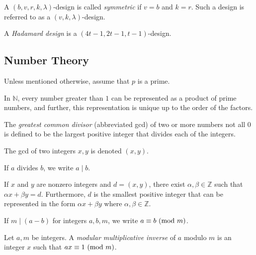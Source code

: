 \begin{definition}
    A $(b,v,r,k,\lambda)$-design is called \textit{symmetric} if $v=b$ and $k=r$. Such a design is referred to as a $(v,k,\lambda)$-design.
\end{definition}


\begin{definition}
    A \textit{Hadamard design} is a $(4t-1,2t-1,t-1)$-design.
\end{definition}

\subsection{Number Theory}
Unless mentioned otherwise, assume that $p$ is a prime.
\begin{theorem}
    In $\mathbb{N}$, every number greater than $1$ can be represented as a product of prime numbers, and further, this representation is unique up to the order of the factors.
\end{theorem}

\begin{definition}
    The \textit{greatest common divisor} (abbreviated gcd) of two or more numbers not all $0$ is defined to be the largest positive integer that divides each of the integers.
\end{definition}

The gcd of two integers $x,y$ is denoted $(x,y)$.

If $a$ divides $b$, we write $a\mid b$.

\begin{lemma}
\label{BezoutsLemma}
    If $x$ and $y$ are nonzero integers and $d=(x,y)$, there exist $\alpha,\beta\in\mathbb{Z}$ such that $\alpha x+\beta y=d$. Furthermore, $d$ is the smallest positive integer that can be represented in the form $\alpha x+\beta y$ where $\alpha,\beta\in\mathbb{Z}$.
\end{lemma}

\vspace{2mm}
If $m\mid (a-b)$ for integers $a,b,m$, we write $a\equiv b\ (\mathrm{mod}\ m)$.

\begin{definition}
    Let $a,m$ be integers. A \textit{modular multiplicative inverse} of $a$ modulo $m$ is an integer $x$ such that $ax\equiv 1\ (\mathrm{mod}\ m)$.
\end{definition}

